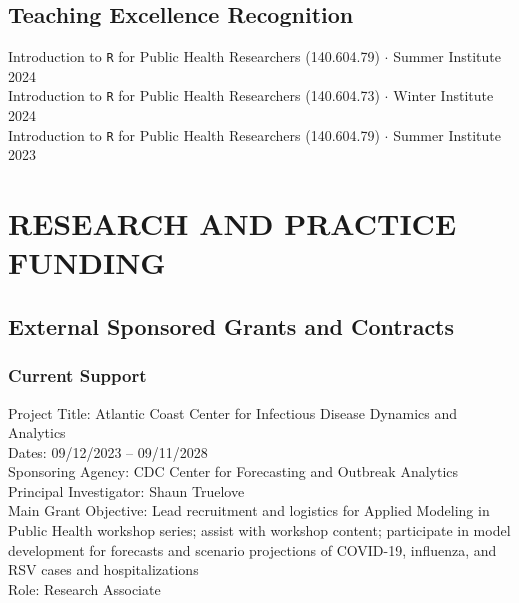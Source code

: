 \documentclass{cv}
\begin{document}

\subsection*{Teaching Excellence Recognition}

Introduction to \texttt{R} for Public Health Researchers (140.604.79) $\cdot$ Summer Institute 2024 \\
Introduction to \texttt{R} for Public Health Researchers (140.604.73) $\cdot$ Winter Institute 2024 \\
Introduction to \texttt{R} for Public Health Researchers (140.604.79) $\cdot$ Summer Institute 2023


\section*{RESEARCH AND PRACTICE FUNDING}

\subsection*{External Sponsored Grants and Contracts}

\subsubsection*{Current Support}

Project Title: Atlantic Coast Center for Infectious Disease Dynamics and Analytics \\
Dates: 09/12/2023 -- 09/11/2028 \\
Sponsoring Agency: CDC Center for Forecasting and Outbreak Analytics \\
Principal Investigator: Shaun Truelove \\
Main Grant Objective: Lead recruitment and logistics for Applied Modeling in Public Health workshop series; assist with workshop content; participate in model development for forecasts and scenario projections of COVID-19, influenza, and RSV cases and hospitalizations \\
Role: Research Associate
\end{document}
